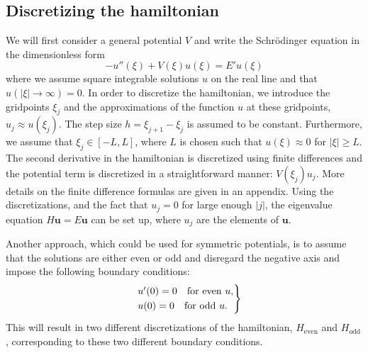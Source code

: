 \documentclass[twocolumn]{article}
\begin{document}
\begin{large}
\subsection*{Discretizing the hamiltonian}
We will first consider a general potential $V$ and write the Schrödinger equation in the dimensionless form
\begin{equation}
    \label{2apr1953}
    -u''(\xi) + V(\xi)u(\xi) = E'u(\xi)
\end{equation}
where we assume square integrable solutions $u$ on the real line and that $u(|\xi|\to\infty) = 0$. In order to discretize the hamiltonian, we introduce the gridpoints $\xi_j$ and the approximations of the function $u$ at these gridpoints, $u_j\approx u(\xi_j)$. The step size $h=\xi_{j+1}-\xi_j$ is assumed to be constant. Furthermore, we assume that $\xi_j\in[-L,L]$, where $L$ is chosen such that $u(\xi)\approx 0$ for $|\xi|\geq L$. The second derivative in the hamiltonian is discretized using finite differences and the potential term is discretized in a straightforward manner: $V(\xi_j)u_j$. More details on the finite difference formulas are given in an appendix. Using the discretizations, and the fact that $u_j=0$ for large enough $|j|$, the eigenvalue equation $H\mathbf{u} = E\mathbf{u}$ can be set up, where $u_j$ are the elements of $\mathbf{u}$. 

Another approach, which could be used for symmetric potentials, is to assume that the solutions are either even or odd and disregard the negative axis and impose the following boundary conditions:
\begin{equation}
    \begin{rcases}
        &u'(0) = 0 \quad \text{for even } u, \\ 
        &u(0) = 0  \quad \text{for odd } u.
    \end{rcases}
\end{equation} 
This will result in two different discretizations of the hamiltonian, $H_\text{even}$ and $H_\text{odd}$, corresponding to these two different boundary conditions. 


\end{large}
\end{document}
